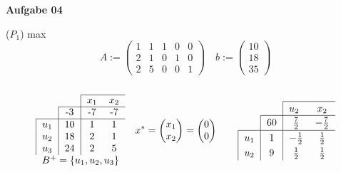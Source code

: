\documentclass[a4paper,10pt]{article}
\begin{document}
	\ \\ \\	
	\textbf{Aufgabe 04}
	\begin{compactenum} [(a)]
		\item 
		($P_1$) max\\
		\[
		A:=
		\begin{pmatrix}
		1 & 1 & 1 & 0 & 0\\
		2 & 1 & 0 & 1 & 0\\
		2 & 5 & 0 & 0 & 1
		\end{pmatrix} \quad b:= 
		\begin{pmatrix}
		10\\
		18\\
		35
		\end{pmatrix}
		\]
		\ \\
		\[
		\begin{tabular}{cccc}
			\cline{3-4}
			& \multicolumn{1}{c|}{}    & \multicolumn{1}{c}{$x_1$} & \multicolumn{1}{c}{$x_2$} \\ \cline{2-4}
			\multicolumn{1}{c|}{}    & \multicolumn{1}{c|}{-3} & \multicolumn{1}{c}{-7}   & \multicolumn{1}{c}{-7} \\ \hline
			\multicolumn{1}{|c|}{$u_1$} & \multicolumn{1}{c|}{10} & 1 & 1\\
			\multicolumn{1}{|c|}{$u_2$} & \multicolumn{1}{c|}{18} & 2 & 1\\
			\multicolumn{1}{|c|}{$u_3$} & \multicolumn{1}{c|}{24} & 2 & 5\\
			\multicolumn{4}{c}{$B^+ = \{u_1, u_2, u_3\}$} 
		\end{tabular}
		\quad
		x^* = 
		\begin{pmatrix}
		x_1\\
		x_2
		\end{pmatrix}
		=
		\begin{pmatrix}
		0\\
		0
		\end{pmatrix}
		\quad
		\quad
		\setlength{\extrarowheight}{2pt}
		\begin{tabular}{cccc}
			\cline{3-4}
			& \multicolumn{1}{c|}{}    & \multicolumn{1}{l}{$u_2$} & \multicolumn{1}{c}{$x_2$} \\ \cline{2-4} 
			\multicolumn{1}{c|}{}    & \multicolumn{1}{c|}{60} & \multicolumn{1}{c}{$\frac{7}{2}$} & \multicolumn{1}{c}{$-\frac{7}{2}$} \\ [1pt]\hline 
			\multicolumn{1}{|c|}{$u_1$} & \multicolumn{1}{c|}{1} & $-\frac{1}{2}$ & $\frac{1}{2}$ \\ [1pt]
			\multicolumn{1}{|c|}{$u_2$} & \multicolumn{1}{c|}{9} & $\frac{1}{2}$ & $\frac{1}{2}$ \\ [1pt]

\end{tabular}\]
\end{compactenum}
\end{document}
